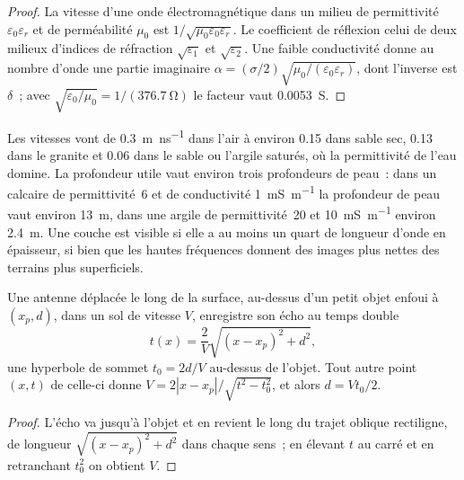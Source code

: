 \begin{proof}
La vitesse d'une onde électromagnétique dans un milieu de permittivité
$\varepsilon_0\varepsilon_r$ et de perméabilité $\mu_0$ est
$1/\sqrt{\mu_0\varepsilon_0\varepsilon_r}$. Le coefficient de réflexion
celui de deux milieux d'indices de réfraction $\sqrt{\varepsilon_1}$ et
$\sqrt{\varepsilon_2}$. Une faible conductivité donne au nombre d'onde une
partie imaginaire $\alpha = (\sigma/2)\sqrt{\mu_0/(\varepsilon_0
\varepsilon_r)}$, dont l'inverse est $\delta$~; avec $\sqrt{\varepsilon_0/
\mu_0} = 1/(\qty{376.7}{\ohm})$ le facteur vaut \qty{0.0053}{S}.
\end{proof}

Les vitesses vont de \qty{0.3}{m.ns^{-1}} dans l'air à environ \num{0.15} dans
sable sec, \num{0.13} dans le granite et \num{0.06} dans le sable ou l'argile saturés,
où la permittivité de l'eau domine. La profondeur utile vaut
environ trois profondeurs de peau~: dans un calcaire de permittivité~6 et de
conductivité \qty{1}{mS.m^{-1}} la profondeur de peau vaut environ \qty{13}{m},
dans une argile de permittivité~20 et \qty{10}{mS.m^{-1}} environ
\qty{2.4}{m}. Une couche est visible si elle a au moins un quart de
longueur d'onde en épaisseur, si bien que les hautes fréquences donnent
des images plus nettes des terrains plus superficiels.

\begin{proposition}\label{prop:b3:field-lab-methods-3:hyperbola}
Une antenne déplacée le long de la surface, au-dessus d'un petit objet enfoui à
$(x_p, d)$, dans un sol de vitesse $V$, enregistre son écho au
temps double
\[
t(x) = \frac{2}{V}\sqrt{(x - x_p)^2 + d^2} ,
\]
une hyperbole de sommet $t_0 = 2d/V$ au-dessus de l'objet. Tout autre point
$(x, t)$ de celle-ci donne $V = 2|x - x_p|/\sqrt{t^2 - t_0^2}$, et alors $d =
Vt_0/2$.
\end{proposition}

\begin{proof}
L'écho va jusqu'à l'objet et en revient le long du trajet oblique rectiligne,
de longueur $\sqrt{(x - x_p)^2 + d^2}$ dans chaque sens~; en élevant $t$ au carré et
en retranchant $t_0^2$ on obtient $V$.
\end{proof}

